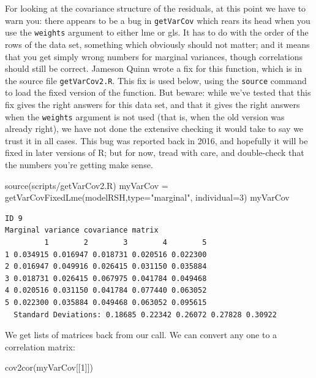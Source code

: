 \documentclass[
  letterpaper,
  DIV=11,
  numbers=noendperiod]{scrreprt}
\newenvironment{Shaded}{\begin{snugshade}}{\end{snugshade}}
\newcommand{\AttributeTok}[1]{\textcolor[rgb]{0.49,0.56,0.16}{#1}}
\newcommand{\DecValTok}[1]{\textcolor[rgb]{0.25,0.63,0.44}{#1}}
\newcommand{\FunctionTok}[1]{\textcolor[rgb]{0.02,0.16,0.49}{#1}}
\newcommand{\NormalTok}[1]{\textcolor[rgb]{0.00,0.44,0.13}{#1}}
\newcommand{\OtherTok}[1]{\textcolor[rgb]{0.00,0.44,0.13}{#1}}
\newcommand{\StringTok}[1]{\textcolor[rgb]{0.25,0.44,0.63}{#1}}
\begin{document}
For looking at the covariance structure of the residuals, at this point
we have to warn you: there appears to be a bug in \texttt{getVarCov}
which rears its head when you use the \texttt{weights} argument to
either lme or gls. It has to do with the order of the rows of the data
set, something which obviously should not matter; and it means that you
get simply wrong numbers for marginal variances, though correlations
should still be correct. Jameson Quinn wrote a fix for this function,
which is in the source file \texttt{getVarCov2.R}. This fix is used
below, using the \texttt{source} command to load the fixed version of
the function. But beware: while we've tested that this fix gives the
right answers for this data set, and that it gives the right answers
when the \texttt{weights} argument is not used (that is, when the old
version was already right), we have not done the extensive checking it
would take to say we trust it in all cases. This bug was reported back
in 2016, and hopefully it will be fixed in later versions of R; but for
now, tread with care, and double-check that the numbers you're getting
make sense.

\begin{Shaded}
\begin{Highlighting}[]
\FunctionTok{source}\NormalTok{(}\StringTok{\textquotesingle{}scripts/getVarCov2.R\textquotesingle{}}\NormalTok{)}
\NormalTok{myVarCov }\OtherTok{=} \FunctionTok{getVarCovFixedLme}\NormalTok{(modelRSH,}\AttributeTok{type=}\StringTok{"marginal"}\NormalTok{, }\AttributeTok{individual=}\DecValTok{3}\NormalTok{)}
\NormalTok{myVarCov}
\end{Highlighting}
\end{Shaded}

\begin{verbatim}
ID 9 
Marginal variance covariance matrix
         1        2        3        4        5
1 0.034915 0.016947 0.018731 0.020516 0.022300
2 0.016947 0.049916 0.026415 0.031150 0.035884
3 0.018731 0.026415 0.067975 0.041784 0.049468
4 0.020516 0.031150 0.041784 0.077440 0.063052
5 0.022300 0.035884 0.049468 0.063052 0.095615
  Standard Deviations: 0.18685 0.22342 0.26072 0.27828 0.30922 
\end{verbatim}

We get lists of matrices back from our call. We can convert any one to a
correlation matrix:

\begin{Shaded}
\begin{Highlighting}[]
\FunctionTok{cov2cor}\NormalTok{(myVarCov[[}\DecValTok{1}\NormalTok{]])}
\end{Highlighting}
\end{Shaded}
\end{document}
